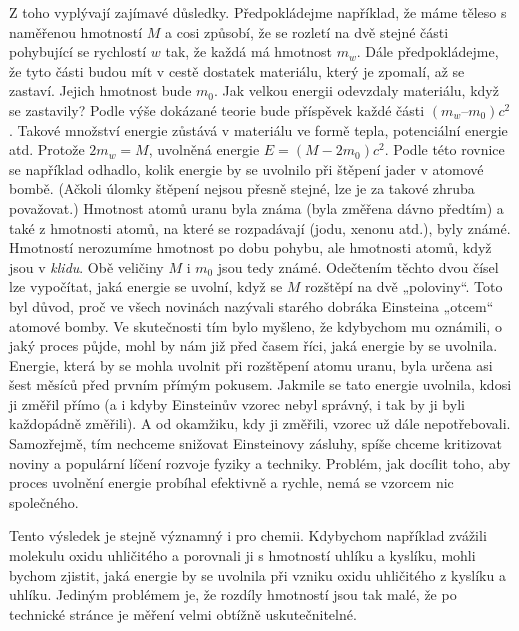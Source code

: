 {    Z toho vyplývají zajímavé důsledky. Předpokládejme například, že máme těleso s naměřenou 
    hmotností \(M\) a cosi způsobí, že se rozletí na dvě stejné části pohybující se rychlostí \(w\) 
    tak, že každá má hmotnost \(m_w\). Dále předpokládejme, že tyto části budou mít v cestě 
    dostatek materiálu, který je zpomalí, až se zastaví. Jejich hmotnost bude \(m_0\). Jak velkou 
    energii odevzdaly materiálu, když se zastavily? Podle výše dokázané teorie bude příspěvek každé 
    části \((m_w – m_0)c^2\). Takové množství energie zůstává v materiálu ve formě tepla, 
    potenciální energie atd. Protože \(2m_w = M\), uvolněná energie \(E = (M - 2m_0)c^2\). Podle 
    této rovnice se například odhadlo, kolik energie by se uvolnilo při štěpení jader v atomové 
    bombě. (Ačkoli úlomky štěpení nejsou přesně stejné, lze je za takové zhruba považovat.) 
    Hmotnost atomů uranu byla známa (byla změřena dávno předtím) a také z hmotnosti atomů, na které 
    se rozpadávají (jodu, xenonu atd.), byly známé. Hmotností nerozumíme hmotnost po dobu pohybu, 
    ale hmotnosti atomů, když jsou v \emph{klidu}. Obě veličiny \(M\) i \(m_0\) jsou tedy známé. 
    Odečtením těchto dvou čísel lze vypočítat, jaká energie se uvolní, když se \(M\) rozštěpí na 
    dvě „poloviny“. Toto byl důvod, proč ve všech novinách nazývali starého dobráka Einsteina 
    „otcem“ atomové bomby. Ve skutečnosti tím bylo myšleno, že kdybychom mu oznámili, o jaký proces 
    půjde, mohl by nám již před časem říci, jaká energie by se uvolnila. Energie, která by se mohla 
    uvolnit při rozštěpení atomu uranu, byla určena asi šest měsíců před prvním přímým pokusem. 
    Jakmile se tato energie uvolnila, kdosi ji změřil přímo (a i kdyby Einsteinův vzorec nebyl 
    správný, i tak by ji byli každopádně změřili). A od okamžiku, kdy ji změřili, vzorec už dále 
    nepotřebovali. Samozřejmě, tím nechceme snižovat Einsteinovy zásluhy, spíše chceme kritizovat 
    noviny a populární líčení rozvoje fyziky a techniky. Problém, jak docílit toho, aby proces 
    uvolnění energie probíhal efektivně a rychle, nemá se vzorcem nic společného.
    
    Tento výsledek je stejně významný i pro chemii. Kdybychom například zvážili molekulu oxidu 
    uhličitého a porovnali ji s hmotností uhlíku a kyslíku, mohli bychom zjistit, jaká energie by 
    se uvolnila při vzniku oxidu uhličitého z kyslíku a uhlíku. Jediným problémem je, že rozdíly 
    hmotností jsou tak malé, že po technické stránce je měření velmi obtížně uskutečnitelné.
    
}
